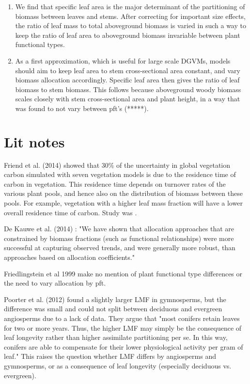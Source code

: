 \documentclass[a4paper]{article}
\begin{document}
\begin{enumerate}
  \item We find that specific leaf area is the major determinant of the partitioning of biomass between leaves and stems. After correcting for important size effects, the ratio of leaf mass to total aboveground biomass is varied in such a way to keep the ratio of leaf area to aboveground biomass invariable between plant functional types.
  \item As a first approximation, which is useful for large scale DGVMs, models should aim to keep leaf area to stem cross-sectional area constant, and vary biomass allocation accordingly. Specific leaf area then gives the ratio of leaf biomass to stem biomass. This follows because aboveground woody biomass scales closely with stem cross-sectional area and plant height, in a way that was found to not vary between pft's (*****). 


\end{enumerate}






\section{Lit notes}

Friend et al. (2014) showed that 30\% of the uncertainty in global vegetation carbon simulated with seven vegetation models is due to the residence time of carbon in vegetation. This residence time depends on turnover rates of the various plant pools, and hence also on the distribution of biomass between these pools. For example, vegetation with a higher leaf mass fraction will have a lower overall residence time of carbon. Study was \cite{friend_carbon_2014}.

De Kauwe et al. (2014) : "We have shown that allocation approaches that are constrained by biomass fractions (such as functional relationships) were more successful at capturing observed trends, and were generally more robust, than approaches based on allocation coefficients."

Friedlingstein et al 1999 make no mention of plant functional type differences or the need to vary allocation by pft.

Poorter et al. (2012) found a slightly larger LMF in gymnosperms, but the difference was small and could not split between deciduous and evergreen angiosperms due to a lack of data. They argue that "most conifers retain leaves for two or more years. Thus, the higher LMF may simply be the consequence of leaf longevity rather than higher assimilate partitioning per se. In this way, conifers are able to compensate for their lower physiological activity per gram of leaf." This raises the question whether LMF differs by angiosperms and gymnosperms, or as a consequence of leaf longevity (especially deciduous vs. evergreen).
\end{document}
